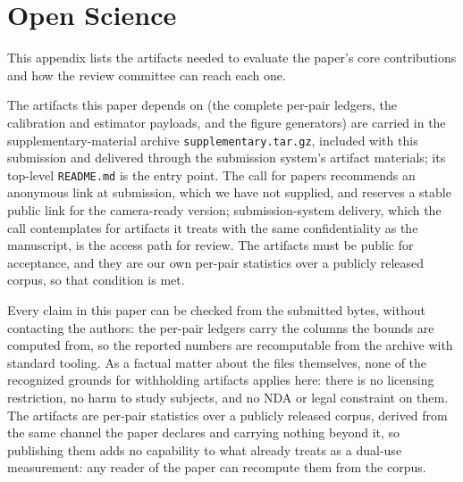 \documentclass[sigconf,anonymous,review]{acmart}
\begin{document}
\section*{Open Science}
\begingroup\sloppy


This appendix lists the artifacts needed to evaluate the paper's core
contributions and how the review committee can reach each one.

The artifacts this paper depends on (the complete per-pair ledgers, the
calibration and estimator payloads, and the figure generators) are carried in
the supplementary-material archive \texttt{supplementary.tar.gz}, included with
this submission and delivered through the submission system's artifact
materials; its top-level \texttt{README.md} is the entry point. The call for
papers recommends an anonymous link at submission, which we have not supplied,
and reserves a stable public link for the camera-ready version; submission-system
delivery, which the call contemplates for artifacts it treats with the same
confidentiality as the manuscript, is the access path for review. The artifacts
must be public for acceptance, and they are our own per-pair statistics over a
publicly released corpus, so that condition is met.

Every claim in this paper can be checked from the submitted bytes, without
contacting the authors: the per-pair ledgers carry the columns the bounds are
computed from, so the reported numbers are recomputable from the archive with
standard tooling. As a factual matter about the files
themselves, none of the recognized grounds for withholding artifacts applies
here: there is no licensing restriction, no harm to study subjects, and no NDA
or legal constraint on them. The artifacts are per-pair statistics over a
publicly released corpus, derived from the same channel the paper declares and
carrying nothing beyond it, so publishing them adds no capability to what
 already treats as a dual-use measurement: any
reader of the paper can recompute them from the corpus.
\end{document}
